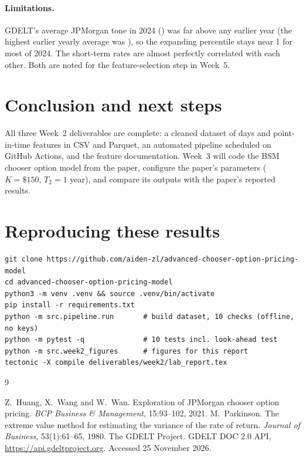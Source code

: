 \documentclass[11pt]{article}
\begin{document}
\paragraph{Limitations.} GDELT's average JPMorgan tone in 2024 (\wTonetwentyfour{}) was far above any earlier year (the
highest earlier yearly average was \wToneprevmax{}), so the expanding percentile stays near 1 for most of 2024. The short-term rates are almost
perfectly correlated with each other. Both are noted for the feature-selection step in Week~5.

\section{Conclusion and next steps}
All three Week~2 deliverables are complete: a cleaned dataset of \wRows{} days and \wFeatures{} point-in-time features
in CSV and Parquet, an automated pipeline scheduled on GitHub Actions, and the feature documentation. Week~3 will code
the BSM chooser option model from the paper, configure the paper's parameters ($K=\$150$, $T_2=1$ year), and compare
its outputs with the paper's reported results.

\appendix
\section{Reproducing these results}
\begin{lstlisting}
git clone https://github.com/aiden-zl/advanced-chooser-option-pricing-model
cd advanced-chooser-option-pricing-model
python3 -m venv .venv && source .venv/bin/activate
pip install -r requirements.txt
python -m src.pipeline.run       # build dataset, 10 checks (offline, no keys)
python -m pytest -q              # 10 tests incl. look-ahead test
python -m src.week2_figures      # figures for this report
tectonic -X compile deliverables/week2/lab_report.tex
\end{lstlisting}

\begin{thebibliography}{9}\small\raggedright
{} Z.~Huang, X.~Wang and W.~Wan. Exploration of JPMorgan chooser option pricing.
  \emph{BCP Business \& Management}, 15:93--102, 2021.
 M.~Parkinson. The extreme value method for estimating the variance of the rate of return.
  \emph{Journal of Business}, 53(1):61--65, 1980.
 The GDELT Project. GDELT DOC 2.0 API, \url{https://api.gdeltproject.org}. Accessed 25 November 2026.
\end{thebibliography}
\end{document}

